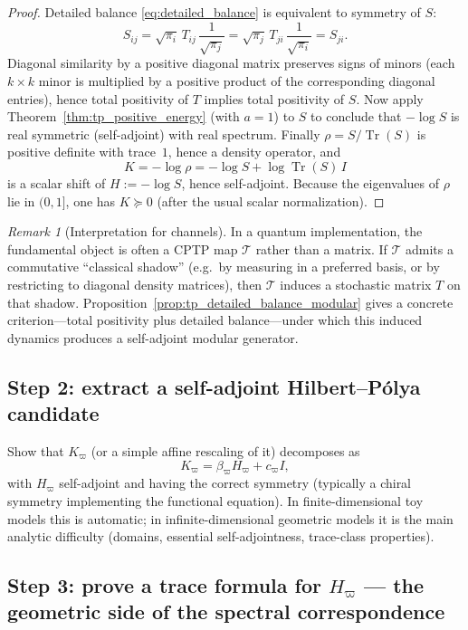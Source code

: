 \documentclass[11pt,oneside]{amsbook}
\numberwithin{equation}{section}
\theoremstyle{plain}
\theoremstyle{definition}
\theoremstyle{remark}
\newtheorem{remark}[theorem]{Remark}
\DeclareMathOperator{\Tr}{\mathrm{Tr}}
\begin{document}
\begin{proof}
Detailed balance \eqref{eq:detailed_balance} is equivalent to symmetry of $S$:
\[
S_{ij}=\sqrt{\pi_i}\,T_{ij}\,\frac{1}{\sqrt{\pi_j}}
=
\sqrt{\pi_j}\,T_{ji}\,\frac{1}{\sqrt{\pi_i}}
=S_{ji}.
\]
Diagonal similarity by a positive diagonal matrix preserves signs of minors (each $k\times k$ minor is multiplied by a positive product of the corresponding diagonal entries), hence total positivity of $T$ implies total positivity of $S$.
Now apply Theorem~\ref{thm:tp_positive_energy} (with $a=1$) to $S$ to conclude that $-\log S$ is real symmetric (self-adjoint) with real spectrum.
Finally $\rho=S/\Tr(S)$ is positive definite with trace~$1$, hence a density operator, and
\[
K=-\log\rho = -\log S + \log\Tr(S)\,I
\]
is a scalar shift of $H:=-\log S$, hence self-adjoint.
Because the eigenvalues of $\rho$ lie in $(0,1]$, one has $K\succeq 0$ (after the usual scalar normalization).
\end{proof}

\begin{remark}[Interpretation for channels]
In a quantum implementation, the fundamental object is often a CPTP map $\mathcal{T}$ rather than a matrix.
If $\mathcal{T}$ admits a commutative ``classical shadow'' (e.g.\ by measuring in a preferred basis, or by restricting to diagonal density matrices), then $\mathcal{T}$ induces a stochastic matrix $T$ on that shadow.
Proposition~\ref{prop:tp_detailed_balance_modular} gives a concrete criterion---total positivity plus detailed balance---under which this induced dynamics produces a self-adjoint modular generator.
\end{remark}


\subsection{Step 2: extract a self-adjoint Hilbert--Pólya candidate}
Show that $K_\varpi$ (or a simple affine rescaling of it) decomposes as
\[
K_\varpi = \beta_\varpi H_\varpi + c_\varpi I,
\]
with $H_\varpi$ self-adjoint and having the correct symmetry (typically a chiral symmetry implementing the functional equation).
In finite-dimensional toy models this is automatic; in infinite-dimensional geometric models it is the main analytic difficulty (domains, essential self-adjointness, trace-class properties).

\subsection{Step 3: prove a trace formula for $H_\varpi$ --- the geometric side of the spectral correspondence}
\end{document}
